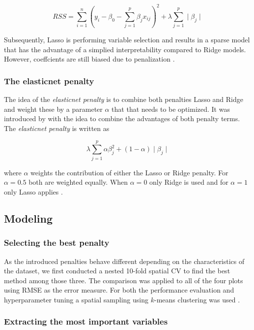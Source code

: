 \documentclass[review]{elsarticle}
\begin{document}
\begin{equation}
	RSS = \sum_{i=1}^{n} \left(y_{i} - \beta_{0} - \sum_{j=1}^{p} \beta_{j} x_{ij} \right) ^{2} + \lambda \sum_{j=1}^{p} \mid\beta_{j}\mid
\end{equation}

Subsequently, Lasso is performing variable selection and results in a sparse model that has the advantage of a simplied interpretability compared to Ridge models.
However, coeffcients are still biased due to penalization \citep{Hastie2001, James2013}.

\subsubsection{The elasticnet penalty}

The idea of the \textit{elasticnet penalty} is to combine both penalties Lasso and Ridge and weight these by a parameter $\alpha$ that that needs to be optimized.
It was introduced by \cite{Zou2005} with the idea to combine the advantages of both penalty terms.
The \textit{elasticnet penalty} is written as

\begin{equation}
	\lambda \sum_{j=1}^{p} \alpha\beta_{j}^{2} + (1 - \alpha) \mid\beta_{j}\mid
\end{equation}

where $\alpha$ weights the contribution of either the Lasso or Ridge penalty.
For $\alpha = 0.5$ both are weighted equally.
When $\alpha = 0$ only Ridge is used and for $\alpha = 1$ only Lasso applies \citep{Hastie2001}.

\subsection{Modeling}

\subsubsection{Selecting the best penalty}

As the introduced penalties behave different depending on the characteristics of the dataset, we first conducted a nested 10-fold spatial \ac{CV} to find the best method among those three.
The comparison was applied to all of the four plots using \ac{RMSE} as the error measure.
For both the performance evaluation and hyperparameter tuning a spatial sampling using $k$-means clustering was used \citep{sperrorest}.

\subsubsection{Extracting the most important variables}
\end{document}
